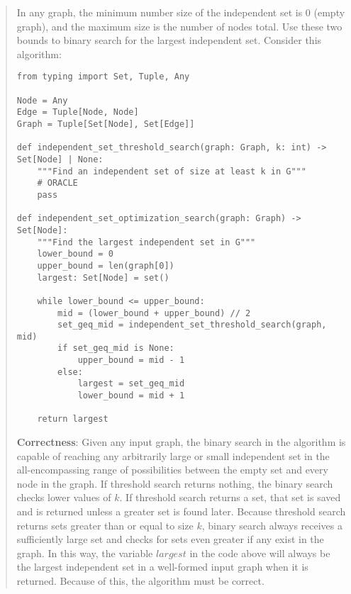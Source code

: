 \documentclass[11pt]{article}
\begin{document}
\begin{enumerate}
\begin{enumerate}
\begin{quote}
    \color{purple}
    In any graph, the minimum number size of the independent set is 0 (empty graph), and the maximum size is the number of nodes total. Use these two bounds to binary search for the largest independent set. Consider this algorithm: \newline 
    \begin{verbatim}
from typing import Set, Tuple, Any

Node = Any
Edge = Tuple[Node, Node]
Graph = Tuple[Set[Node], Set[Edge]]

def independent_set_threshold_search(graph: Graph, k: int) -> Set[Node] | None:
    """Find an independent set of size at least k in G"""
    # ORACLE
    pass

def independent_set_optimization_search(graph: Graph) -> Set[Node]:
    """Find the largest independent set in G"""
    lower_bound = 0
    upper_bound = len(graph[0])
    largest: Set[Node] = set()

    while lower_bound <= upper_bound:
        mid = (lower_bound + upper_bound) // 2
        set_geq_mid = independent_set_threshold_search(graph, mid)
        if set_geq_mid is None:
            upper_bound = mid - 1
        else:
            largest = set_geq_mid
            lower_bound = mid + 1

    return largest
    \end{verbatim}
    \vspace{1em}
    \textbf{Correctness}: \newline 
    Given any input graph, the binary search in the algorithm is capable of reaching any arbitrarily large or small independent set in the all-encompassing range of possibilities between the empty set and every node in the graph. If threshold search returns nothing, the binary search checks lower values of $k$. If threshold search returns a set, that set is saved and is returned unless a greater set is found later. Because threshold search returns sets greater than or equal to size $k$, binary search always receives a sufficiently large set and checks for sets even greater if any exist in the graph. In this way, the variable $largest$ in the code above will always be the largest independent set in a well-formed input graph when it is returned. Because of this, the algorithm must be correct. \newline 


\end{quote}
\end{enumerate}
\end{enumerate}
\end{document}
